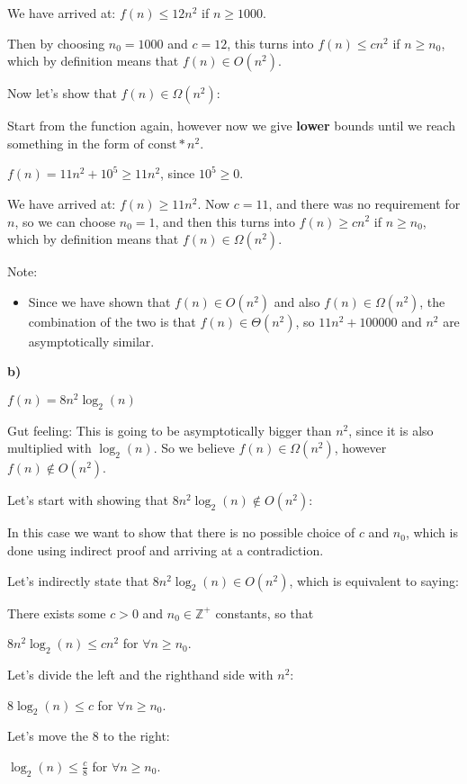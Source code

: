 We have arrived at: $f(n) \leq{} 12n^2$ if $n\geq{}1000$.

Then by choosing $n_0=1000$ and $c=12$, this turns into $f(n) \leq{} cn^2$ if $n\geq{}n_0$, which by definition means that $f(n) \in{} O(n^2)$.

Now let's show that $f(n)\in{}\Omega(n^2)$:

Start from the function again, however now we give \textbf{lower} bounds until we reach something in the form of $\text{const}*n^2$.

$f(n) = 11n^2 + 10^5 \geq{} 11n^2$, since $10^5\geq{}0$.

We have arrived at: $f(n) \geq{} 11n^2$. Now $c=11$, and there was no requirement for $n$, so we can choose $n_0=1$, and then this turns into $f(n) \geq{} cn^2$ if $n\geq{}n_0$, which by definition means that $f(n)\in{}\Omega(n^2)$.

Note:
\begin{itemize}
    \item Since we have shown that $f(n)\in{}O(n^2)$ and also $f(n)\in{}\Omega(n^2)$, the combination of the two is that $f(n)\in{}\Theta(n^2)$, so $11n^2+100000$ and $n^2$ are asymptotically similar.
\end{itemize}

\textbf{b)}

$f(n) = 8n^2\log_2(n)$

Gut feeling: This is going to be asymptotically bigger than $n^2$, since it is also multiplied with $\log_2(n)$. So we believe $f(n)\in{}\Omega(n^2)$, however $f(n)\notin{}O(n^2)$.

Let's start with showing that $8n^2\log_2(n)\notin{}O(n^2)$:

In this case we want to show that there is no possible choice of $c$ and $n_0$, which is done using indirect proof and arriving at a contradiction.

Let's indirectly state that $8n^2\log_2(n)\in{}O(n^2)$, which is equivalent to saying:

There exists some $c>0$ and $n_0\in{}\mathds{Z^+}$ constants, so that

$8n^2\log_2(n) \leq{} cn^2$ for $\forall n\geq{}n_0$.

Let's divide the left and the righthand side with $n^2$:

$8\log_2(n) \leq{} c$ for $\forall n\geq{}n_0$.

Let's move the $8$ to the right:

$\log_2(n) \leq{} \frac{c}{8}$ for $\forall n\geq{}n_0$.

